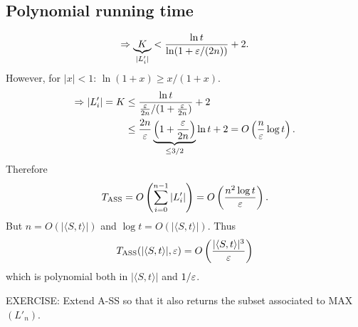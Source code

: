 \subsection{Polynomial running time}
\[\Rightarrow\underbrace{K}_{|L'_i|}<\frac{\ln t}{\ln(1+\varepsilon/(2n))}+2.\]
However, for $|x|<1$: $\ln(1+x)\geq x/(1+x)$.
\begin{align*}
\Rightarrow |L'_i|=K
&\leq\frac{\ln t}{\frac{\varepsilon}{2n}/(1+\frac{\varepsilon}{2n})}+2\\
&\leq\frac{2n}{\varepsilon}\underbrace{\left(1+\frac{\varepsilon}{2n}\right)}_{\leq3/2}\ln t+2
=O\left(\frac n{\varepsilon}\log t\right).
\end{align*}
Therefore
\[T_{\mathrm{ASS}}=O\left(\sum_{i=0}^{n-1}|L'_i|\right)
=O\left(\frac{n^2\log t}{\varepsilon}\right).\]
But $n=O(|\langle S,t\rangle|)$ and $\log t=O(|\langle S,t\rangle|)$.
Thus
\[T_{\mathrm{ASS}}(|\langle S,t\rangle|,\varepsilon)=O\left(\frac{|\langle S,t\rangle|^3}{\varepsilon}\right)\]
which is polynomial both in $|\langle S,t\rangle|$ and $1/\varepsilon$.
\begin{notesresult}
EXERCISE: Extend A-SS so that it also returns the subset associated to MAX$(L'_n)$.
\end{notesresult}

